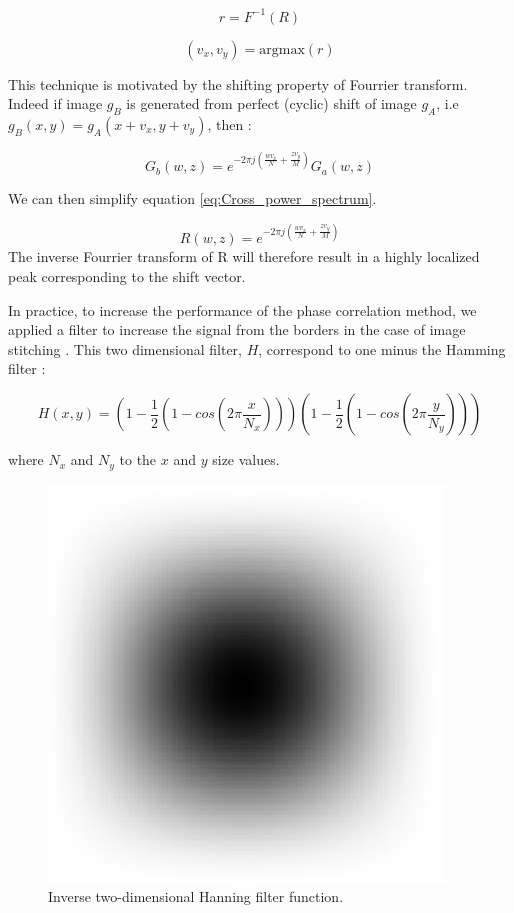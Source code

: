 \documentclass[12pt]{article}
\begin{document}
\begin{equation}
r = F^{-1}(R)
\end{equation}

\begin{equation}
(v_{x},v_{y}) = \text{argmax}(r)
\end{equation}

This technique is motivated by the shifting property of Fourrier transform. Indeed if image $g_{B}$ is generated from perfect (cyclic) shift of image $g_{A}$, i.e  $g_{B}(x,y) = g_{A}(x+v_{x},y+v_{y})$, then :

\begin{equation}
 G_{b}(w,z) = e^{-2\pi j (\frac{w v_{x} }{N}+ \frac{z v_{y} }{M})}G_{a}(w,z)
\end{equation}

We can then simplify equation  \ref{eq:Cross_power_spectrum}.

\begin{equation}
R(w,z) = e^{-2\pi j (\frac{w v_{x} }{N}+ \frac{z v_{y} }{M})}
\end{equation}
The inverse Fourrier transform of R will therefore result in a highly localized peak corresponding to the shift vector.


In practice, to increase the performance of the phase correlation method, we applied a filter to increase the signal from the borders in the case of image stitching . This two dimensional filter, $H$, correspond to one minus the Hamming filter :

\begin{equation}
H(x,y) = (1 -  \frac{1}{2} (1-cos(2 \pi \frac{x}{N_{x}}))) (1 -  \frac{1}{2} (1-cos(2 \pi \frac{y}{N_{y}})))
\end{equation}

where $N_{x}$ and $N_{y}$ to the $x$ and $y$ size values.

\begin{figure}[!h]
	\begin{center}
	
		\includegraphics[width=0.5\linewidth]{Hanning_inverse.jpg}
		\caption{Inverse two-dimensional Hanning filter function.}
		\label{Fig:Diffusion}
	\end{center}
\end{figure}
\end{document}
